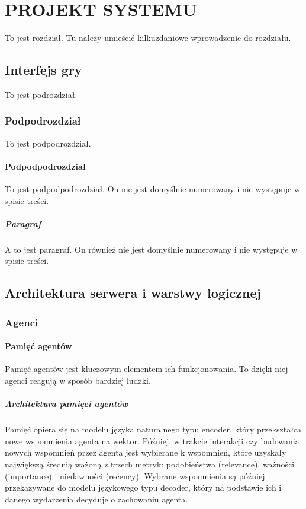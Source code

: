 \chapter{PROJEKT SYSTEMU}

To jest rozdział. Tu należy umieścić kilkuzdaniowe wprowadzenie do rozdziału.




\section{Interfejs gry}

To jest podrozdział.

\subsection{Podpodrozdział}

To jest podpodrozdział.

\subsubsection{Podpodpodrozdział}

To jest podpodpodrozdział. On nie jest domyślnie numerowany i nie występuje w spisie treści.

\paragraph{Paragraf}

A to jest paragraf. On również nie jest domyślnie numerowany i nie występuje w spisie treści.




\section{Architektura serwera i warstwy logicznej}
\label{sec:architektura_serwera}

\subsection{Agenci}

\subsubsection{Pamięć agentów}
Pamięć agentów jest kluczowym elementem ich funkcjonowania.
To dzięki niej agenci reagują w sposób bardziej ludzki.

\paragraph{Architektura pamięci agentów}
Pamięć opiera się na modelu języka naturalnego typu encoder, który przekształca
nowe wspomnienia agenta na wektor. Później, w trakcie interakcji czy budowania nowych
wspomnień przez agenta jest wybierane k wspomnień, które uzyskały największą średnią
ważoną z trzech metryk: podobieństwa (relevance), ważności (importance) i niedawności (recency).
Wybrane wspomnienia są później przekazywane do modelu językowego typu decoder, który na
podstawie ich i danego wydarzenia decyduje o zachowaniu agenta.

